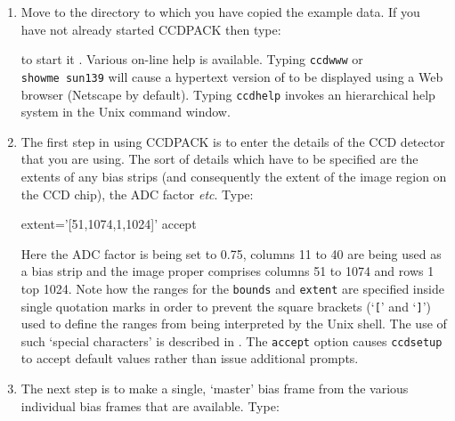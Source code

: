 \documentclass[twoside,11pt]{starlink}
\begin{document}
\begin{enumerate}

  \item Move to the directory to which you have copied the example data.
   If you have not already started CCDPACK then type:

\begin{terminalv}
\end{terminalv}

   to start it .  Various on-line help is available.  Typing \texttt{ccdwww} or
   \texttt{showme~sun139} will cause a hypertext version of
    to be displayed using a Web browser (Netscape
   by default).  Typing \texttt{ccdhelp}  invokes an hierarchical help
   system in the Unix command window.

  \item The first step in using CCDPACK is to enter the details of the
   CCD detector that you are using.  The sort of details which have to
   be specified are the extents of any bias strips (and consequently the
   extent of the image region on the CCD chip), the ADC factor \emph{etc}.
   Type:

\begin{terminalv}
    extent='[51,1074,1,1024]' accept
\end{terminalv}

   Here the ADC factor is being set to 0.75, columns 11 to 40 are being
   used as a bias strip and the image proper comprises columns 51 to
   1074 and rows 1 top 1024.  Note how the ranges for the \texttt{bounds}
   and \texttt{extent} are specified inside single quotation marks in
   order to prevent the square brackets (`\texttt{[}' and `\texttt{]}')
   used to define the ranges from being interpreted by the Unix shell.
   The use of such `special characters' is described in \cite{SC4}.  The \texttt{accept} option
   causes \texttt{ccdsetup} to accept default values rather than issue
   additional prompts.

  \item The next step is to make a single, `master' bias frame from the
   various individual bias frames that are available.  Type:

\begin{terminalv}
\end{terminalv}


\end{enumerate}
\end{document}
